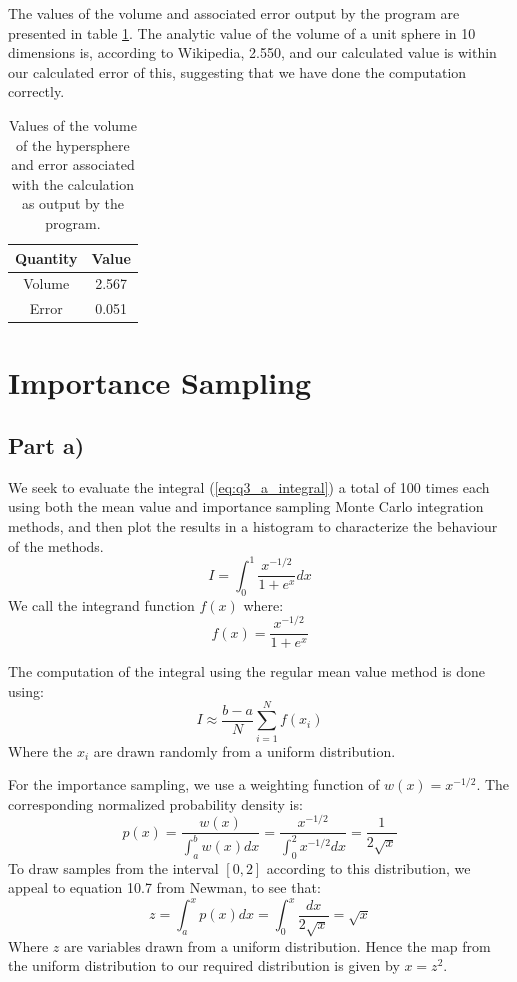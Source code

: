 \documentclass{article}
\begin{document}
The values of the volume and associated error output by the program are presented in table \ref{tab:q2}. The analytic value of the volume of a unit sphere in 10 dimensions is, according to Wikipedia, 2.550, and our calculated value is within our calculated error of this, suggesting that we have done the computation correctly.

\begin{table}[H]
	\centering
	\caption{Values of the volume of the hypersphere and error associated with the calculation as output by the program.}
	\label{tab:q2}
	\begin{tabular}{c|c}
		Quantity & Value \\
		\hline
		Volume & 2.567 \\
		Error & 0.051
	\end{tabular}
\end{table}

\section{Importance Sampling}

\subsection{Part a)}

We seek to evaluate the integral (\ref{eq:q3_a_integral}) a total of 100 times each using both the mean value and importance sampling Monte Carlo integration methods, and then plot the results in a histogram to characterize the behaviour of the methods.
\begin{equation}
	\label{eq:q3_a_integral}
	I = \int_0^1 \frac{x^{-1/2}}{1+e^x}dx
\end{equation}
We call the integrand function $f(x)$ where:
\begin{equation}
	f(x) = \frac{x^{-1/2}}{1+e^x}
\end{equation}

The computation of the integral using the regular mean value method is done using:
\begin{equation}
	\label{eq:q3_mv}
	I \approx \frac{b-a}{N}\sum_{i=1}^N f(x_i)
\end{equation}
Where the $x_i$ are drawn randomly from a uniform distribution.

For the importance sampling, we use a weighting function of $w(x) = x^{-1/2}$. The corresponding normalized probability density is:
\begin{equation}
	p(x) = \frac{w(x)}{\int_a^b w(x)dx} = \frac{x^{-1/2}}{\int_0^2 x^{-1/2}dx} = \frac{1}{2\sqrt{x}}
\end{equation}
To draw samples from the interval $[0,2]$ according to this distribution, we appeal to equation 10.7 from Newman, to see that:
\begin{equation}
	z = \int_a^x p(x)dx = \int_0^x \frac{dx}{2\sqrt{x}} = \sqrt{x} 
\end{equation}
Where $z$ are variables drawn from a uniform distribution. Hence the map from the uniform distribution to our required distribution is given by $x = z^2$.
\end{document}
